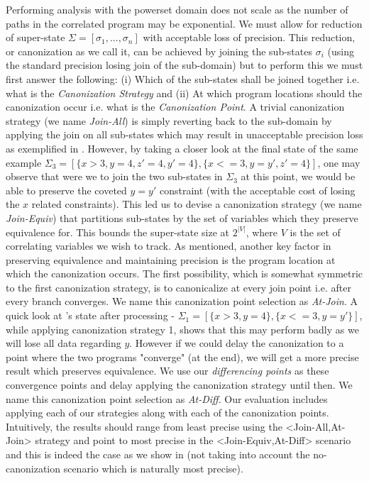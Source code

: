 Performing analysis with the powerset domain does not scale as the number of paths in the correlated program may be exponential. We must allow for reduction of super-state $\Sigma = [\sigma_1,...,\sigma_n]$ with acceptable loss of precision. This reduction, or canonization as we call it, can be achieved by joining the sub-states $\sigma_i$ (using the standard precision losing join of the sub-domain) but to perform this we must first answer the following: (i) Which of the sub-states shall be joined together i.e. what is the \emph{Canonization Strategy} and (ii) At which program locations should the canonization occur i.e. what is the \emph{Canonization Point}. A trivial canonization strategy (we name \emph{Join-All}) is simply reverting back to the sub-domain by applying the join on all sub-states which may result in unacceptable precision loss as exemplified in . However, by taking a closer look at the final state of the same example $\Sigma_3 = [\{x>3,y=4,z'=4,y'=4\},\{x<=3,y=y',z'=4\}]$, one may observe that were we to join the two sub-states in $\Sigma_3$ at this point, we would be able to preserve the coveted $y=y'$ constraint (with the acceptable cost of losing the $x$ related constraints). This led us to devise a canonization strategy (we name \emph{Join-Equiv}) that partitions sub-states by the set of variables which they preserve equivalence for. This bounds the super-state size at $2^{|V|}$, where $V$ is the set of correlating variables we wish to track. As mentioned, another key factor in preserving equivalence and maintaining precision is the program location at which the canonization occurs. The first possibility, which is somewhat symmetric to the first canonization strategy, is to canonicalize at every join point i.e. after every branch converges. We name this canonization point selection as \emph{At-Join}. A quick look at 's state after processing  - $\Sigma_1 = [\{x>3,y=4\},\{x<=3,y=y'\}]$, while applying canonization strategy 1, shows that this may perform badly as we will lose all data regarding $y$. However if we could delay the canonization to a point where the two programs "converge" (at the end), we will get a more precise result which preserves equivalence. We use our \emph{differencing points} as these convergence points and delay applying the canonization strategy until then. We name this canonization point selection as \emph{At-Diff}. Our evaluation includes applying each of our strategies along with each of the canonization points. Intuitively, the results should range from least precise using the <Join-All,At-Join> strategy and point to most precise in the <Join-Equiv,At-Diff> scenario and this is indeed the case as we show in  (not taking into account the no-canonization scenario which is naturally most precise).

